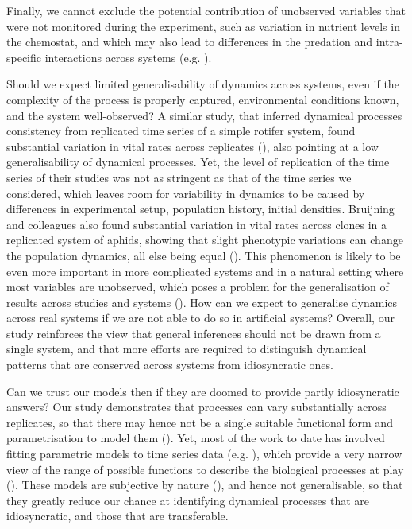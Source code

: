 \documentclass[11pt, oneside]{article}
\begin{document}
Finally, we cannot exclude the potential contribution of unobserved variables that were not monitored during the experiment, such as variation in nutrient levels in the chemostat, and which may also lead to differences in the predation and intra-specific interactions across systems (e.g. \cite{Bonsall2003,Fussmann2005,Posey2006}).

Should we expect limited generalisability of dynamics across systems, even if the complexity of the process is properly captured, environmental conditions known, and the system well-observed?
A similar study, that inferred dynamical processes consistency from replicated time series of a simple rotifer system, found substantial variation in vital rates across replicates (\cite{Rosenbaum2019}), also pointing at a low generalisability of dynamical processes.
Yet, the level of replication of the time series of their studies was not as stringent as that of the time series we considered, which leaves room for variability in dynamics to be caused by differences in experimental setup, population history, initial densities. 
Bruijning and colleagues also found substantial variation in vital rates across clones in a replicated system of aphids, showing that slight phenotypic variations can change the population dynamics, all else being equal (\cite{Bruijning2019}).
This phenomenon is likely to be even more important in more complicated systems and in a natural setting where most variables are unobserved, which poses a problem for the generalisation of results across studies and systems (\cite{DeMeester2019}). 
How can we expect to generalise dynamics across real systems if we are not able to do so in artificial systems?
Overall, our study reinforces the view that general inferences should not be drawn from a single system, and that more efforts are required to distinguish dynamical patterns that are conserved across systems from idiosyncratic ones.

Can we trust our models then if they are doomed to provide partly idiosyncratic answers?
Our study demonstrates that processes can vary substantially across replicates, so that there may hence not be a single suitable functional form and parametrisation to model them (\cite{Lawton1999}).
Yet, most of the work to date has involved fitting parametric models to time series data (e.g. \cite{Bruijning2019,Pontarp2019,Rosenbaum2019}), which provide a very narrow view of the range of possible functions to describe the biological processes at play (\cite{Jost2000,Adamson2013}). 
These models are subjective by nature (\cite{Jost2000,Adamson2013}), and hence not generalisable, so that they greatly reduce our chance at identifying dynamical processes that are idiosyncratic, and those that are transferable.
\end{document}
